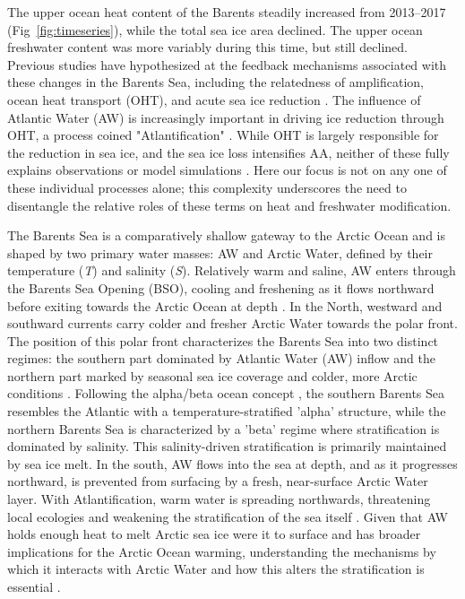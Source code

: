 \documentclass[draft]{agujournal2019}
\begin{document}
The upper ocean heat content of the Barents steadily increased from 2013--2017 (Fig~\ref{fig:timeseries}), while the total sea ice area declined. The upper ocean freshwater content was more variably during this time, but still declined. Previous studies have hypothesized at the feedback mechanisms associated with these changes in the Barents Sea, including the relatedness of amplification, ocean heat transport (OHT), and acute sea ice reduction \cite{Screen2010,Arthun2012,Stroeve2018,Previdi2021}. The influence of Atlantic Water (AW) is  increasingly important in driving ice reduction through OHT, a process coined "Atlantification" \cite{Polyakov2017,Arthun2019}. While OHT is largely responsible for the reduction in sea ice, and the sea ice loss intensifies AA, neither of these fully explains observations \cite{Screen2010,Smedsrud2013} or model simulations \cite{Pithan2014,Li2017}. Here our focus is not on any one of these individual processes alone; this complexity underscores the need to disentangle the relative roles of these terms on heat and freshwater modification.

The Barents Sea is a comparatively shallow gateway to the Arctic Ocean and is shaped by two primary water masses: AW and Arctic Water, defined by their temperature (\emph{T}) and salinity (\emph{S}). Relatively warm and saline, AW enters through the Barents Sea Opening (BSO), cooling and freshening as it flows northward before exiting towards the Arctic Ocean at depth \cite{Loeng1991,Smedsrud2010}. In the North, westward and southward currents carry colder and fresher Arctic Water towards the polar front. The position of this polar front characterizes the Barents Sea into two distinct regimes: the southern part dominated by Atlantic Water (AW) inflow \cite{Hakkinen2009} and the northern part marked by seasonal sea ice coverage and colder, more Arctic conditions \cite{kolas2024}. Following the alpha/beta ocean concept \cite{Nansen1902,Carmack2007,Stewart2016}, the southern Barents Sea resembles the Atlantic with a temperature-stratified 'alpha' structure, while the northern Barents Sea is characterized by a 'beta' regime where stratification is dominated by salinity. This salinity-driven stratification is primarily maintained by sea ice melt. In the south, AW flows into the sea at depth, and as it progresses northward, is prevented from surfacing by a fresh, near-surface Arctic Water layer. With Atlantification, warm water is spreading northwards, threatening local ecologies \cite{Bogstad2015,Dalpadado2014,Ingvaldsen2021} and weakening the stratification of the sea itself \cite{Lind2018}. Given that AW holds enough heat to melt Arctic sea ice were it to surface and has broader implications for the Arctic Ocean warming, understanding the mechanisms by which it interacts with Arctic Water and how this alters the stratification is essential \cite{Polyakov2017,Stroeve2018,Skagseth2020,Grabon2021}.
\end{document}
